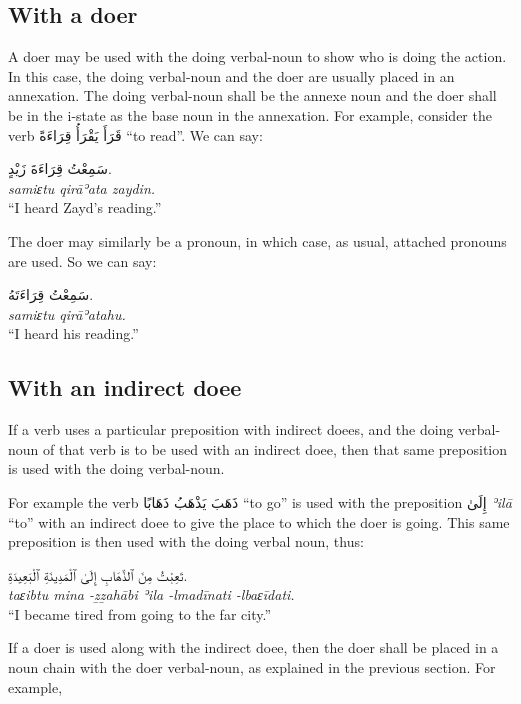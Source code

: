 \documentclass[
  10pt,
]{book}
\begin{document}
\subsection{With a doer}\label{with-a-doer}

A doer may be used with the doing verbal-noun to show who is doing the action. In this case, the doing verbal-noun and the doer are usually placed in an annexation. The doing verbal-noun shall be the annexe noun and the doer shall be in the i-state as the base noun in the annexation. For example, consider the verb \foreignlanguage{arabic}{قَرَأَ يَقْرَأُ قِرَاءَةً} \enquote{to read}. We can say:

\foreignlanguage{arabic}{سَمِعْتُ قِرَاءَةَ زَيْدٍ.}\\
\emph{samiɛtu qirāʾata zaydin.}\\
\enquote{I heard Zayd's reading.}

The doer may similarly be a pronoun, in which case, as usual, attached pronouns are used. So we can say:

\foreignlanguage{arabic}{سَمِعْتُ قِرَاءَتَهُ.}\\
\emph{samiɛtu qirāʾatahu.}\\
\enquote{I heard his reading.}

\subsection{With an indirect doee}\label{with-an-indirect-doee}

If a verb uses a particular preposition with indirect doees, and the doing verbal-noun of that verb is to be used with an indirect doee, then that same preposition is used with the doing verbal-noun.

For example the verb \foreignlanguage{arabic}{ذَهَبَ يَذْهَبُ ذَهَابًا} \enquote{to go} is used with the preposition \foreignlanguage{arabic}{إِلَىٰ} \emph{ʾilā} \enquote{to} with an indirect doee to give the place to which the doer is going. This same preposition is then used with the doing verbal noun, thus:

\foreignlanguage{arabic}{تَعِبْتُ مِنَ ٱلذَّهَابِ إِلَىٰ ٱلْمَدِينَةِ ٱلْبَعِيدَةِ.}\\
\emph{taɛibtu mina -ẕẕahābi ʾila -lmadīnati -lbaɛīdati.}\\
\enquote{I became tired from going to the far city.}

If a doer is used along with the indirect doee, then the doer shall be placed in a noun chain with the doer verbal-noun, as explained in the previous section. For example,
\end{document}
